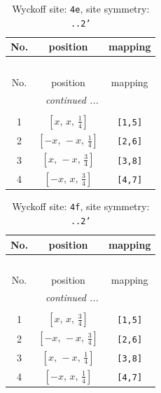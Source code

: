 \documentclass[fleqn,8pt]{jsarticle}
\begin{document}
\begin{longtable}{ccc}
\caption{Wyckoff site: {\tt 4e}, site symmetry: {\tt ..2'}}
 \\
 \hline \hline
No. & position & mapping \\ \hline \endfirsthead

\multicolumn{2}{l}{\tablename\ \thetable{}} \\
 \hline \hline
No. & position & mapping \\ \hline \endhead

 \hline \hline
\multicolumn{2}{r}{\footnotesize\it continued ...} \\ \endfoot

 \hline \hline
\multicolumn{2}{r}{} \\ \endlastfoot

1 & $\left[ x,\, x,\, \frac{1}{4} \right]$ & {\tt [1,5]} \\ \hline
2 & $\left[ - x,\, - x,\, \frac{1}{4} \right]$ & {\tt [2,6]} \\ \hline
3 & $\left[ x,\, - x,\, \frac{3}{4} \right]$ & {\tt [3,8]} \\ \hline
4 & $\left[ - x,\, x,\, \frac{3}{4} \right]$ & {\tt [4,7]} \\
\end{longtable}
\renewcommand{\arraystretch}{1.2}
\begin{longtable}{ccc}
\caption{Wyckoff site: {\tt 4f}, site symmetry: {\tt ..2'}}
 \\
 \hline \hline
No. & position & mapping \\ \hline \endfirsthead

\multicolumn{2}{l}{\tablename\ \thetable{}} \\
 \hline \hline
No. & position & mapping \\ \hline \endhead

 \hline \hline
\multicolumn{2}{r}{\footnotesize\it continued ...} \\ \endfoot

 \hline \hline
\multicolumn{2}{r}{} \\ \endlastfoot

1 & $\left[ x,\, x,\, \frac{3}{4} \right]$ & {\tt [1,5]} \\ \hline
2 & $\left[ - x,\, - x,\, \frac{3}{4} \right]$ & {\tt [2,6]} \\ \hline
3 & $\left[ x,\, - x,\, \frac{1}{4} \right]$ & {\tt [3,8]} \\ \hline
4 & $\left[ - x,\, x,\, \frac{1}{4} \right]$ & {\tt [4,7]} \\
\end{longtable}
\end{document}
